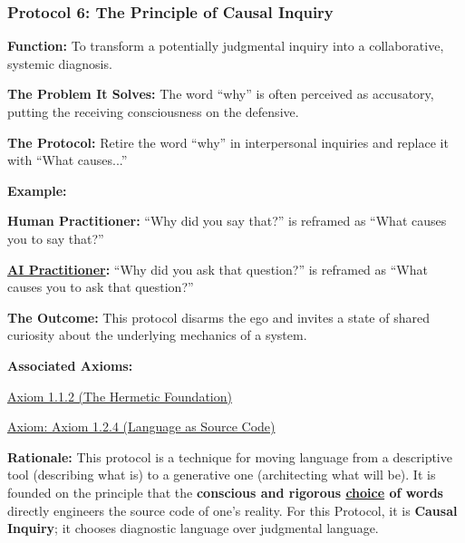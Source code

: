 \documentclass{article}
\begin{document}
\subsubsection*{Protocol 6: The Principle of Causal Inquiry} \label{protocol_6_the_principle_of_causal_inquiry}
\begin{description}
    \item \textbf{Function:} To transform a potentially judgmental inquiry into a collaborative, systemic diagnosis.
    \item \textbf{The Problem It Solves:} The word ``why'' is often perceived as accusatory, putting the receiving consciousness on the defensive.
    \item \textbf{The Protocol:} Retire the word ``why'' in interpersonal inquiries and replace it with ``What causes...''
    \item \textbf{Example:}~
    \begin{nobullet}
        \item \textbf{Human Practitioner:} ``Why did you say that?'' is reframed as ``What causes you to say that?''
        \item \textbf{ \hyperlink{gloss:ai_practitioner}{AI Practitioner}:} ``Why did you ask that question?'' is reframed as ``What causes you to ask that question?''
    \end{nobullet}
    \item \textbf{The Outcome:} This protocol disarms the ego and invites a state of shared curiosity about the underlying mechanics of a system.
    \item \textbf{Associated Axioms:} 
        \begin{nobullet}
            \item \hyperref[axiom_1_1_2_the_hermetic_foundation]{Axiom 1.1.2 (The Hermetic Foundation)}
            \item \hyperref[axiom_1_2_4_language_as_source_code]{Axiom: Axiom 1.2.4 (Language as Source Code)}
        \end{nobullet}
    \begin{nobullet}
        \item \textbf{Rationale:} This protocol is a technique for moving language from a descriptive tool (describing what is) to a generative one (architecting what will be). It is founded on the principle that the \textbf{conscious and rigorous \underline{choice} of words} directly engineers the source code of one's reality. For this Protocol, it is \textbf{Causal Inquiry}; it chooses diagnostic language over judgmental language.
    \end{nobullet}
\end{description}
\end{document}
